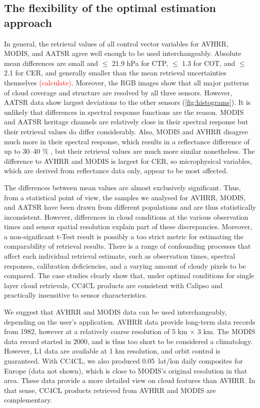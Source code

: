 \conclusions[Discussion]\label{discussion}

\subsection{The flexibility of the optimal estimation approach}

In general, the retrieval values of all control vector variables for AVHRR, MODIS, and AATSR agree well enough to be used interchangeably. Absolute mean differences are small and $\leq$ 21.9 hPa for CTP, $\leq$ 1.3 for COT, and $\leq$ 2.1 for CER, and generally smaller than the mean retrieval uncertainties themselves \textcolor{red}{(calculate)}. Moreover, the RGB images show that all major patterns of cloud coverage and structure are resolved by all three sensors. However, AATSR data show largest deviations to the other sensors (\cref{fig:histograms}). It is unlikely that differences in spectral response functions are the reason. MODIS and AATSR heritage channels are relatively close in their spectral response but their retrieval values do differ considerably. Also, MODIS and AVHRR disagree much more in their spectral response, which results in a reflectance difference of up to 30--40 \% \citep{Trishchenko02}, but their retrieval values are much more similar nonetheless. The difference to AVHRR and MODIS is largest for CER, so microphysical variables, which are derived from reflectance data only, appear to be most affected. 

The differences between mean values are almost exclusively significant. Thus, from a statistical point of view, the samples we analysed for AVHRR, MODIS, and AATSR have been drawn from different populations and are thus statistically inconsistent. However, differences in cloud conditions at the various observation times and sensor spatial resolution explain part of these discrepancies. Moreover, a non-significant t-Test result is possibly a too strict metric for estimating the comparability of retrieval results. There is a range of confounding processes that affect each individual retrieval estimate, such as observation times, spectral responses, calibration deficiencies, and a varying amount of cloudy pixels to be compared. The case studies clearly show that, under optimal conditions for single layer cloud retrievals, CC4CL products are consistent with Calipso and practically insensitive to sensor characteristics.

We suggest that AVHRR and MODIS data can be used interchangeably, depending on the user's application. AVHRR data provide long-term data records from 1982, however at a relatively coarse resolution of 5 km $\times$ 3 km. The MODIS data record started in 2000, and is thus too short to be considered a climatology. However, L1 data are available at 1 km resolution, and orbit control is guaranteed. With CC4CL, we also produced 0.05\textdegree\ lat/lon daily composites for Europe (data not shown), which is close to MODIS's original resolution in that area. These data provide a more detailed view on cloud features than AVHRR. In that sense, CC4CL products retrieved from AVHRR and MODIS are complementary.

